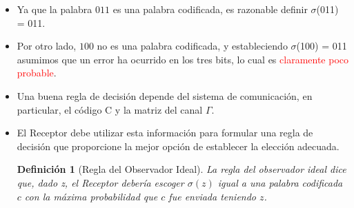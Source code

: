 \documentclass{beamer}
\theoremstyle{plain}
\newtheorem{definicion} [Definicion]{Definición}
\theoremstyle{example}
\theoremstyle{example}
\begin{document}
\begin{frame}  \small  
\begin{itemize} 

\item  Ya que la palabra $011$ es una palabra codificada, es razonable definir $\sigma$(011) = 011. 

\item  Por otro lado, $100$ no es una palabra codificada, y estableciendo  $\sigma$(100) = 011 asumimos que un error ha ocurrido en los tres  bits, lo cual es \textcolor{red}{claramente poco probable}.

\item  Una buena regla de decisión depende del sistema de comunicación, en particular, el código C y la matriz del canal $\Gamma$. 


\item El Receptor debe utilizar esta información para formular una regla de decisión que proporcione la mejor opción de establecer la elección adecuada.

\vspace{0.7cm}

\begin{definicion}[Regla del Observador Ideal]
La regla del observador ideal dice que, dado z, el Receptor debería escoger $\sigma(z)$ igual a una palabra codificada $c$ con la máxima probabilidad que $c$ fue enviada teniendo $z$.
\end{definicion}

\end{itemize} \end{frame}
\end{document}
